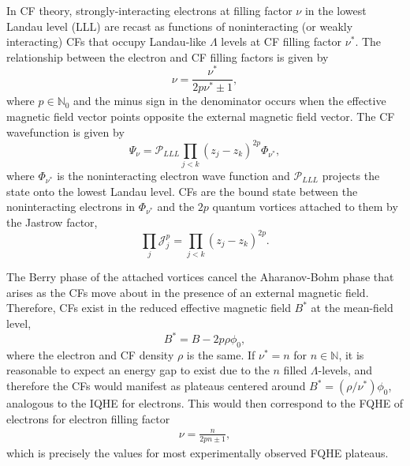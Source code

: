 	In CF theory, strongly-interacting electrons at filling factor $\nu$ in the lowest Landau level (LLL) are recast as functions of noninteracting (or weakly interacting) CFs that occupy Landau-like $\Lambda$ levels at CF filling factor $\nu^*$. The relationship between the electron and CF filling factors is given by
	\begin{equation} \label{compFermFill}
    \nu=\frac{\nu^*}{2p\nu^*\pm1},
    \end{equation}
    where $p\in\mathbb{N}_0$ and the minus sign in the denominator occurs when the effective magnetic field vector points opposite the external magnetic field vector. The CF wavefunction is given by
    \begin{equation} \label{compFermEigFunct}
    \Psi_\nu=\mathcal{P}_{LLL}\prod_{j<k}(z_j-z_k)^{2p}\Phi_{\nu^*},
    \end{equation}
    where $\Phi_{\nu^*}$ is the noninteracting electron wave function and $\mathcal{P}_{LLL}$ projects the state onto the lowest Landau level. CFs are the bound state between the noninteracting electrons in $\Phi_{\nu^*}$ and the $2p$ quantum vortices attached to them by the Jastrow factor,
    \begin{equation}\label{eqn:jastr_fact}
    \prod_{j}\mathcal{J}^p_j=\prod_{j<k}(z_j-z_k)^{2p}.
    \end{equation}
    
    The Berry phase of the attached vortices cancel the Aharanov-Bohm phase that arises as the CFs move about in the presence of an external magnetic field. Therefore, CFs exist in the reduced effective magnetic field $B^*$ at the mean-field level, 
    \begin{equation} \label{compFermMagnField}
    B^*=B-2p\rho\phi_0,
    \end{equation}
    where the electron and CF density $\rho$ is the same. If $\nu^*=n$ for $n\in\mathbb{N}$, it is reasonable to expect an energy gap to exist due to the $n$ filled $\Lambda$-levels, and therefore the CFs would manifest as plateaus centered around $B^*=(\rho/\nu^*)\phi_0$, analogous to the IQHE for electrons. This would then correspond to the FQHE of electrons for electron filling factor
    \begin{eqnarray}
        \nu = \frac{n}{2pn\pm 1},
    \end{eqnarray}
    which is precisely the values for most experimentally observed FQHE plateaus. 
    
